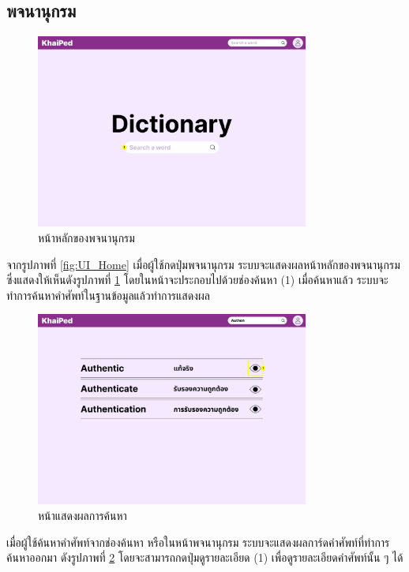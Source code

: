 \documentclass[12pt,oneside,openright,a4paper]{cpe-thai-project}
\begin{document}
\subsection{พจนานุกรม}
\begin{figure}[!h]\centering
	\includegraphics[width=0.8\textwidth, keepaspectratio=true]{image/chap3/ui/dict/Dictionary.png}
	\caption{หน้าหลักของพจนานุกรม}\label{fig:UI_Dictionary}
\end{figure}
\hspace{1cm}
จากรูปภาพที่ \ref{fig:UI_Home} เมื่อผู้ใช้กดปุ่มพจนานุกรม ระบบจะแสดงผลหน้าหลักของพจนานุกรม ซึ่งแสดงให้เห็นดังรูปภาพที่ \ref{fig:UI_Dictionary}
โดยในหน้าจะประกอบไปด้วยช่องค้นหา (1) เมื่อค้นหาแล้ว ระบบจะทำการค้นหาคำศัพท์ในฐานข้อมูลแล้วทำการแสดงผล

\begin{figure}[!h]\centering
	\includegraphics[width=0.8\textwidth, keepaspectratio=true]{image/chap3/ui/dict/Dictionary - Search Word.png}
	\caption{หน้าแสดงผลการค้นหา}\label{fig:UI_DictionarySearch}
\end{figure}
\hspace{1cm}
เมื่อผู้ใช้ค้นหาคำศัพท์จากช่องค้นหา หรือในหน้าพจนานุกรม ระบบจะแสดงผลการ์ดคำศัพท์ที่ทำการค้นหาออกมา
ดังรูปภาพที่ \ref{fig:UI_DictionarySearch} โดยจะสามารถกดปุ่มดูรายละเอียด (1) เพื่อดูรายละเอียดคำศัพท์นั้น ๆ ได้
\end{document}
